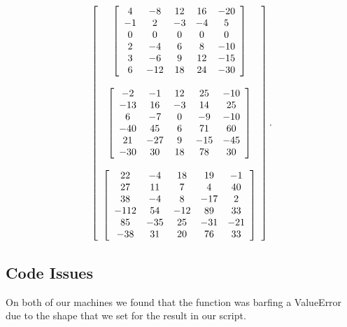\documentclass{article}
\begin{document}
\[
\left[ \begin{array}[c]{c}

\left[ \begin{array}{ccccc}
4 & -8 & 12 & 16 & -20 \\
-1 & 2 & -3 & -4 & 5 \\
0 & 0 & 0 & 0 & 0 \\
2 & -4 & 6 & 8 & -10 \\
3 & -6 & 9 & 12 & -15 \\
6 & -12 & 18 & 24 & -30
\end{array} \right] \\

\\

\left[ \begin{array}{ccccc}
-2 & -1 & 12 & 25 & -10 \\
-13 & 16 & -3 & 14 & 25 \\
6 & -7 & 0 & -9 & -10 \\
-40 & 45 & 6 & 71 & 60 \\
21 & -27 & 9 & -15 & -45 \\
-30 & 30 & 18 & 78 & 30
\end{array} \right] \\

\\

\left[ \begin{array}{ccccc}
22 & -4 & 18 & 19 & -1 \\
27 & 11 & 7 & 4 & 40 \\
38 & -4 & 8 & -17 & 2 \\
-112 & 54 & -12 & 89 & 33 \\
85 & -35 & 25 & -31 & -21 \\
-38 & 31 & 20 & 76 & 33
\end{array} \right]

\end{array}\right].
\]

\subsection{Code Issues}
\label{sec:coding}

On both of our machines we found that the function was barfing a
ValueError due to the shape that we set for the result in our script.
\end{document}
